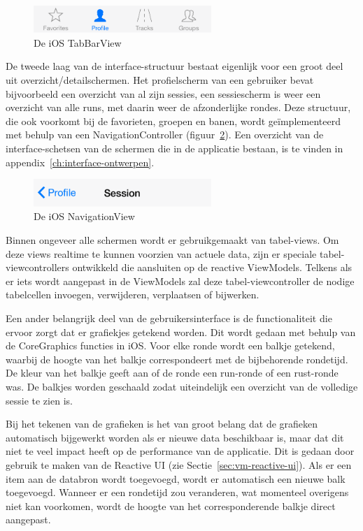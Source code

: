 \begin{figure}[h!t]
\centering
\includegraphics[width=0.6\textwidth]{style/images/TabView}
\caption{De iOS TabBarView}
\label{fig:tab-view}
\end{figure}

De tweede laag van de interface-structuur bestaat eigenlijk voor een groot deel uit overzicht/detailschermen. Het profielscherm van een gebruiker bevat bijvoorbeeld een overzicht van al zijn sessies, een sessiescherm is weer een overzicht van alle runs, met daarin weer de afzonderlijke rondes. Deze structuur, die ook voorkomt bij de favorieten, groepen en banen, wordt geïmplementeerd met behulp van een NavigationController (figuur~\ref{fig:navigation-view}). Een overzicht van de interface-schetsen van de schermen die in de applicatie bestaan, is te vinden in appendix~\ref{ch:interface-ontwerpen}.

\begin{figure}[h!t]
\centering
\includegraphics[width=0.6\textwidth]{style/images/NavigationView}
\caption{De iOS NavigationView}
\label{fig:navigation-view}
\end{figure}

Binnen ongeveer alle schermen wordt er gebruikgemaakt van tabel-views. Om deze views realtime te kunnen voorzien van actuele data, zijn er speciale tabel-viewcontrollers ontwikkeld die aansluiten op de reactive ViewModels. Telkens als er iets wordt aangepast in de ViewModels zal deze tabel-viewcontroller de nodige tabelcellen invoegen, verwijderen, verplaatsen of bijwerken.

Een ander belangrijk deel van de gebruikersinterface is de functionaliteit die ervoor zorgt dat er grafiekjes getekend worden. Dit wordt gedaan met behulp van de CoreGraphics functies in iOS. Voor elke ronde wordt een balkje getekend, waarbij de hoogte van het balkje correspondeert met de bijbehorende rondetijd. De kleur van het balkje geeft aan of de ronde een run-ronde of een rust-ronde was. De balkjes worden geschaald zodat uiteindelijk een overzicht van de volledige sessie te zien is.

Bij het tekenen van de grafieken is het van groot belang dat de grafieken automatisch bijgewerkt worden als er nieuwe data beschikbaar is, maar dat dit niet te veel impact heeft op de performance van de applicatie. Dit is gedaan door gebruik te maken van de Reactive UI (zie Sectie~\ref{sec:vm-reactive-ui}). Als er een item aan de databron wordt toegevoegd, wordt er automatisch een nieuwe balk toegevoegd. Wanneer er een rondetijd zou veranderen, wat momenteel overigens niet kan voorkomen, wordt de hoogte van het corresponderende balkje direct aangepast.

